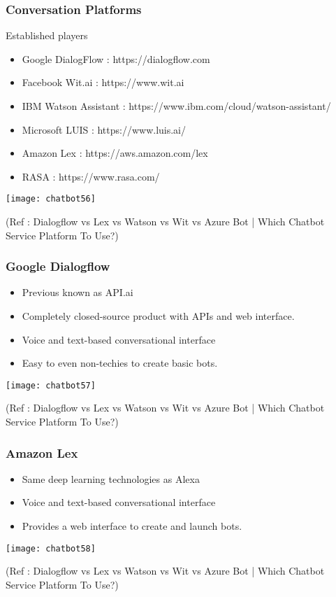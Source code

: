  \begin{frame}[fragile]\frametitle{Conversation Platforms}
 Established players
\begin{itemize}
\item Google DialogFlow : https://dialogflow.com
\item Facebook Wit.ai : https://www.wit.ai
\item IBM Watson Assistant : https://www.ibm.com/cloud/watson-assistant/
\item Microsoft LUIS : https://www.luis.ai/
\item Amazon Lex : https://aws.amazon.com/lex
\item RASA : https://www.rasa.com/
\end{itemize}

\begin{center}
\texttt{[image: chatbot56]}

\tiny{(Ref : Dialogflow vs Lex vs Watson vs Wit vs Azure Bot | Which Chatbot Service Platform To Use?)}
\end{center}

\end{frame}

 \begin{frame}[fragile]\frametitle{Google Dialogflow}
\begin{itemize}
\item Previous known as API.ai
\item Completely closed-source product with APIs and web interface.
\item Voice and text-based conversational interface
\item Easy to even non-techies to create basic bots. 
\end{itemize}

\begin{center}
\texttt{[image: chatbot57]}

\tiny{(Ref : Dialogflow vs Lex vs Watson vs Wit vs Azure Bot | Which Chatbot Service Platform To Use?)}
\end{center}
\end{frame}

 \begin{frame}[fragile]\frametitle{Amazon Lex}
\begin{itemize}
\item Same deep learning technologies as Alexa
\item Voice and text-based conversational interface
\item Provides a web interface to create and launch bots.
\end{itemize}

\begin{center}
\texttt{[image: chatbot58]}

\tiny{(Ref : Dialogflow vs Lex vs Watson vs Wit vs Azure Bot | Which Chatbot Service Platform To Use?)}
\end{center}
\end{frame}

